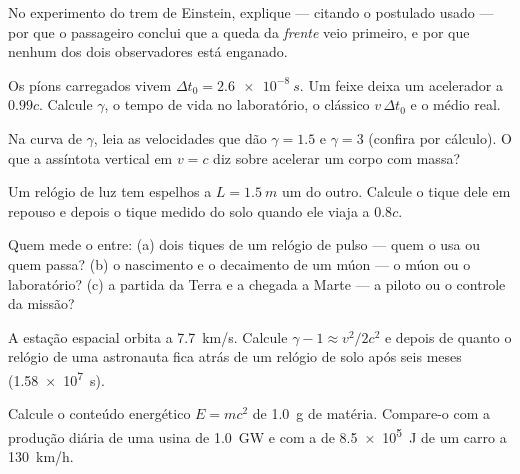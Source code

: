 \begin{exercise}[$\star$]\label{exo:g12:special-relativity:5}
No experimento do trem de Einstein, explique --- citando o postulado usado --- por que o
passageiro conclui que a queda da \emph{frente} veio primeiro, e por que nenhum dos dois
observadores está enganado.
\end{exercise}

\begin{exercise}[$\star\star$]\label{exo:g12:special-relativity:6}
Os píons carregados vivem $\Delta t_0 = \qty{2.6e-8}{s}$. Um feixe deixa um acelerador a
$0.99c$. Calcule $\gamma$, o tempo de vida no laboratório, o  clássico
$v\,\Delta t_0$ e o  médio real.
\end{exercise}

\begin{exercise}[$\star\star$]\label{exo:g12:special-relativity:7}
Na curva de $\gamma$, leia as velocidades que dão $\gamma = 1.5$ e $\gamma = 3$ (confira
por cálculo). O que a assíntota vertical em $v = c$ diz sobre acelerar um corpo com
massa?
\end{exercise}

\begin{exercise}[$\star\star$]\label{exo:g12:special-relativity:8}
Um relógio de luz tem espelhos a $L = \qty{1.5}{m}$ um do outro. Calcule o tique dele em
repouso e depois o tique medido do solo quando ele viaja a $0.8c$.
\end{exercise}

\begin{exercise}[$\star\star$]\label{exo:g12:special-relativity:9}
Quem mede o  entre: (a) dois tiques de um relógio de pulso --- quem o usa ou
quem passa? (b) o nascimento e o decaimento de um múon --- o múon ou o laboratório? (c) a
partida da Terra e a chegada a Marte --- a piloto ou o controle da missão?
\end{exercise}

\begin{exercise}[$\star\star$]\label{exo:g12:special-relativity:10}
A estação espacial orbita a \qty{7.7}{km/s}. Calcule $\gamma - 1 \approx v^2/2c^2$ e
depois de quanto o relógio de uma astronauta fica atrás de um relógio de solo após seis
meses (\qty{1.58e7}{s}).
\end{exercise}

\begin{exercise}[$\star\star$]\label{exo:g12:special-relativity:11}
Calcule o conteúdo energético $E = mc^2$ de \qty{1.0}{g} de matéria. Compare-o com a
produção diária de uma usina de \qty{1.0}{GW} e com a  de \qty{8.5e5}{J}
de um carro a \qty{130}{km/h}.
\end{exercise}

